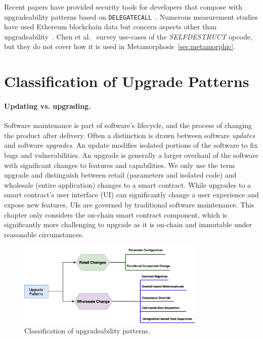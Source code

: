 Recent papers have provided security tools for developers that compose with upgradeability patterns based on  \texttt{DELEGATECALL}~\cite{rodler2021evmpatch,perez2022dissimilar}. Numerous measurement studies have used Ethereum blockchain data but concern aspects other than upgradeability~\cite{perez2019broken,chen2017adaptive,reijsbergen2021transaction,victor2019measuring,pinna2019massive,he2020characterizing}. Chen et al.~\cite{chen2021smart} survey use-cases of the \textit{SELFDESTRUCT} opcode, but they do not cover how it is used in Metamorphosis~\ref{sec:metamorphic}.

\section{Classification of Upgrade Patterns} \label{sec:classification}

\paragraph{Updating vs. upgrading.} Software maintenance is part of software's lifecycle, and the process of changing the product after delivery. Often a distinction is drawn between software \textit{updates} and software \textit{upgrades}. An update modifies isolated portions of the software to fix bugs and vulnerabilities. An upgrade is generally a larger overhaul of the software with significant changes to features and capabilities. We only use the term upgrade and distinguish between retail (parameters and isolated code) and wholesale (entire application) changes to a smart contract. While upgrades to a smart contract's user interface (UI) can significantly change a user experience and expose new features, UIs are governed by traditional software maintenance. This chapter only considers the on-chain smart contract component, which is significantly more challenging to upgrade as it is on-chain and immutable under reasonable circumstances.

\begin{figure}[t]
  \centering
      \includegraphics[width=0.8\textwidth]{figures/New_Classification.png}
  \caption[Classification of Upgradeability Patterns]{Classification of upgradeability patterns.\label{fig:class}}
\end{figure}

